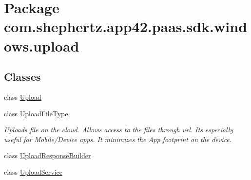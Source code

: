 \hypertarget{namespacecom_1_1shephertz_1_1app42_1_1paas_1_1sdk_1_1windows_1_1upload}{\section{Package com.\+shephertz.\+app42.\+paas.\+sdk.\+windows.\+upload}
\label{namespacecom_1_1shephertz_1_1app42_1_1paas_1_1sdk_1_1windows_1_1upload}
}
\subsection*{Classes}
\begin{DoxyCompactItemize}
\item 
class \hyperlink{classcom_1_1shephertz_1_1app42_1_1paas_1_1sdk_1_1windows_1_1upload_1_1_upload}{Upload}
\item 
class \hyperlink{classcom_1_1shephertz_1_1app42_1_1paas_1_1sdk_1_1windows_1_1upload_1_1_upload_file_type}{Upload\+File\+Type}
\begin{DoxyCompactList}\small\item\em Uploads file on the cloud. Allows access to the files through url. Its especially useful for Mobile/\+Device apps. It minimizes the App footprint on the device. \end{DoxyCompactList}\item 
class \hyperlink{classcom_1_1shephertz_1_1app42_1_1paas_1_1sdk_1_1windows_1_1upload_1_1_upload_response_builder}{Upload\+Response\+Builder}
\item 
class \hyperlink{classcom_1_1shephertz_1_1app42_1_1paas_1_1sdk_1_1windows_1_1upload_1_1_upload_service}{Upload\+Service}
\end{DoxyCompactItemize}
